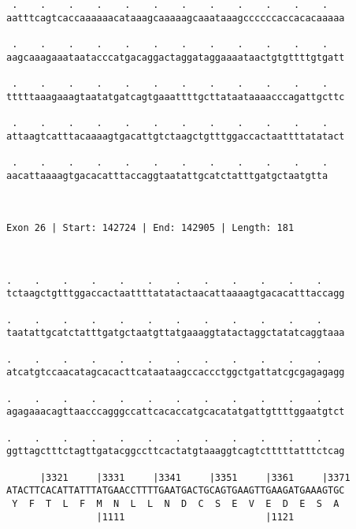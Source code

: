 \documentclass{article}
\begin{document}
\begin{Verbatim}
 .    .    .    .    .    .    .    .    .    .    .    .   
aatttcagtcaccaaaaaacataaagcaaaaagcaaataaagccccccaccacacaaaaa
                                                            
 .    .    .    .    .    .    .    .    .    .    .    .   
aagcaaagaaataatacccatgacaggactaggataggaaaataactgtgttttgtgatt
                                                            
 .    .    .    .    .    .    .    .    .    .    .    .   
tttttaaagaaagtaatatgatcagtgaaattttgcttataataaaacccagattgcttc
                                                            
 .    .    .    .    .    .    .    .    .    .    .    .   
attaagtcatttacaaaagtgacattgtctaagctgtttggaccactaattttatatact
                                                            
 .    .    .    .    .    .    .    .    .    .    .    .
aacattaaaagtgacacatttaccaggtaatattgcatctatttgatgctaatgtta
                                                         
                                                         
 
Exon 26 | Start: 142724 | End: 142905 | Length: 181



.    .    .    .    .    .    .    .    .    .    .    .    
tctaagctgtttggaccactaattttatatactaacattaaaagtgacacatttaccagg
                                                            
.    .    .    .    .    .    .    .    .    .    .    .    
taatattgcatctatttgatgctaatgttatgaaaggtatactaggctatatcaggtaaa
                                                            
.    .    .    .    .    .    .    .    .    .    .    .    
atcatgtccaacatagcacacttcataataagccaccctggctgattatcgcgagagagg
                                                            
.    .    .    .    .    .    .    .    .    .    .    .    
agagaaacagttaacccagggccattcacaccatgcacatatgattgttttggaatgtct
                                                            
.    .    .    .    .    .    .    .    .    .    .    .    
ggttagctttctagttgatacggccttcactatgtaaaggtcagtctttttatttctcag
                                                            
      |3321     |3331     |3341     |3351     |3361     |3371
ATACTTCACATTATTTATGAACCTTTTGAATGACTGCAGTGAAGTTGAAGATGAAAGTGC
 Y  F  T  L  F  M  N  L  L  N  D  C  S  E  V  E  D  E  S  A 
                |1111                         |1121         
  

\end{Verbatim}
\end{document}
